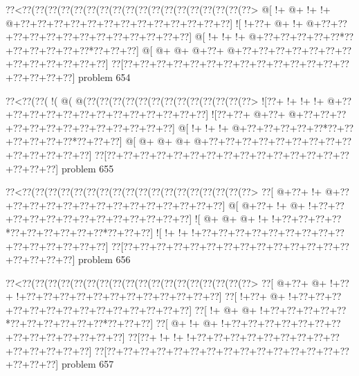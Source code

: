 \vbox{\vbox{\goo
\0??<\0??(\0??(\0??(\0??(\0??(\0??(\0??(\0??(\0??(\0??(\0??(\0??(\0??(\0??(\0??(\0??(\0??(\0??>
\- @[\- !+\- @+\- !+\- !+\- @+\0??+\0??+\0??+\0??+\0??+\0??+\0??+\0??+\0??+\0??+\0??+\0??+\0??]
\- ![\- !+\0??+\- @+\- !+\- @+\0??+\0??+\0??+\0??+\0??+\0??+\0??+\0??+\0??+\0??+\0??+\0??+\0??]
\- @[\- !+\- !+\- !+\- @+\0??+\0??+\0??+\0??+\0??*\0??+\0??+\0??+\0??+\0??+\0??*\0??+\0??+\0??]
\- @[\- @+\- @+\- @+\0??+\- @+\0??+\0??+\0??+\0??+\0??+\0??+\0??+\0??+\0??+\0??+\0??+\0??+\0??]
\0??[\0??+\0??+\0??+\0??+\0??+\0??+\0??+\0??+\0??+\0??+\0??+\0??+\0??+\0??+\0??+\0??+\0??+\0??]
}
\hfil problem 654\hfil\break
}



\vbox{\vbox{\goo
\0??<\0??(\0??(\- !(\- @(\- @(\0??(\0??(\0??(\0??(\0??(\0??(\0??(\0??(\0??(\0??(\0??(\0??(\0??>
\- ![\0??+\- !+\- !+\- !+\- @+\0??+\0??+\0??+\0??+\0??+\0??+\0??+\0??+\0??+\0??+\0??+\0??+\0??]
\- ![\0??+\0??+\- @+\0??+\- @+\0??+\0??+\0??+\0??+\0??+\0??+\0??+\0??+\0??+\0??+\0??+\0??+\0??]
\- @[\- !+\- !+\- !+\- @+\0??+\0??+\0??+\0??+\0??*\0??+\0??+\0??+\0??+\0??+\0??*\0??+\0??+\0??]
\- @[\- @+\- @+\- @+\- @+\0??+\0??+\0??+\0??+\0??+\0??+\0??+\0??+\0??+\0??+\0??+\0??+\0??+\0??]
\0??[\0??+\0??+\0??+\0??+\0??+\0??+\0??+\0??+\0??+\0??+\0??+\0??+\0??+\0??+\0??+\0??+\0??+\0??]
}
\hfil problem 655\hfil\break
}



\vbox{\vbox{\goo
\0??<\0??(\0??(\0??(\0??(\0??(\0??(\0??(\0??(\0??(\0??(\0??(\0??(\0??(\0??(\0??(\0??(\0??(\0??>
\0??[\- @+\0??+\- !+\- @+\0??+\0??+\0??+\0??+\0??+\0??+\0??+\0??+\0??+\0??+\0??+\0??+\0??+\0??]
\- @[\- @+\0??+\- !+\- @+\- !+\0??+\0??+\0??+\0??+\0??+\0??+\0??+\0??+\0??+\0??+\0??+\0??+\0??]
\- ![\- @+\- @+\- @+\- !+\- !+\0??+\0??+\0??+\0??*\0??+\0??+\0??+\0??+\0??+\0??*\0??+\0??+\0??]
\- ![\- !+\- !+\- !+\0??+\0??+\0??+\0??+\0??+\0??+\0??+\0??+\0??+\0??+\0??+\0??+\0??+\0??+\0??]
\0??[\0??+\0??+\0??+\0??+\0??+\0??+\0??+\0??+\0??+\0??+\0??+\0??+\0??+\0??+\0??+\0??+\0??+\0??]
}
\hfil problem 656\hfil\break
}



\vbox{\vbox{\goo
\0??<\0??(\0??(\0??(\0??(\0??(\0??(\0??(\0??(\0??(\0??(\0??(\0??(\0??(\0??(\0??(\0??(\0??(\0??>
\0??[\- @+\0??+\- @+\- !+\0??+\- !+\0??+\0??+\0??+\0??+\0??+\0??+\0??+\0??+\0??+\0??+\0??+\0??]
\0??[\- !+\0??+\- @+\- !+\0??+\0??+\0??+\0??+\0??+\0??+\0??+\0??+\0??+\0??+\0??+\0??+\0??+\0??]
\0??[\- !+\- @+\- @+\- !+\0??+\0??+\0??+\0??+\0??*\0??+\0??+\0??+\0??+\0??+\0??*\0??+\0??+\0??]
\0??[\- @+\- !+\- @+\- !+\0??+\0??+\0??+\0??+\0??+\0??+\0??+\0??+\0??+\0??+\0??+\0??+\0??+\0??]
\0??[\0??+\- !+\- !+\- !+\0??+\0??+\0??+\0??+\0??+\0??+\0??+\0??+\0??+\0??+\0??+\0??+\0??+\0??]
\0??[\0??+\0??+\0??+\0??+\0??+\0??+\0??+\0??+\0??+\0??+\0??+\0??+\0??+\0??+\0??+\0??+\0??+\0??]
}
\hfil problem 657\hfil\break
}



